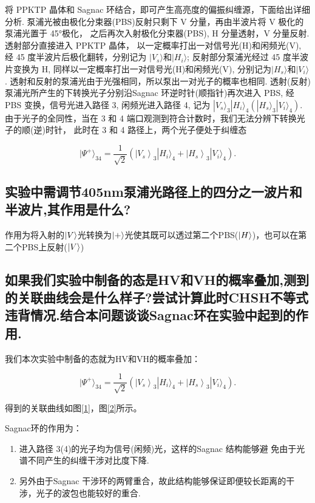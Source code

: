 \documentclass[a4paper,UTF8]{ctexart}
\begin{document}
 将 PPKTP 晶体和 Sagnac 环结合，即可产生高亮度的偏振纠缠源，下面给出详细分析. 
 泵浦光被由极化分束器(PBS)反射只剩下 V 分量，再由半波片将 V 极化的泵浦光置于 45°极化，
 之后再次入射极化分束器(PBS), H 分量透射，V 分量反射.透射部分直接进入 PPKTP 晶体，
 以一定概率打出一对信号光(H)和闲频光(V), 经 45 度半波片后极化翻转，分别记为
 $|V_s\rangle$和$|H_i\rangle$; 反射部分泵浦光经过 45 度半波片变换为 H, 
 同样以一定概率打出一对信号光(H)和闲频光(V), 分别记为$|H_s\rangle$和$|V_i\rangle$.
 透射和反射的泵浦光由于光强相同，所以泵出一对光子的概率也相同.
 透射(反射)泵浦光所产生的下转换光子分别沿Sagnac 环逆时针(顺指针)再次进入 PBS,
  经 PBS 变换，信号光进入路径 3, 闲频光进入路径 4, 记为
  $|V_s\rangle_3|H_i\rangle_4(|H_s\rangle_3|V_i\rangle_4)$.
  由于光子的全同性，当在 3 和 4 端口观测到符合计数时，我们无法分辨下转换光子的顺(逆)时针，
  此时在 3 和 4 路径上，两个光子便处于纠缠态

$$
|\Psi^{+}\rangle_{34}=\frac{1}{\sqrt{2}}\left(\left|V_{s}\right\rangle_{3}|H_{i}\rangle_{4}+\left|H_{s}\right\rangle_{3}|V_{i}\rangle_{4}\right).
$$ 

\subsection{实验中需调节405nm泵浦光路径上的四分之一波片和半波片,其作用是什么?}

作用为将入射的$\ket{V}$光转换为$\ket{+}$光使其既可以透过第二个PBS($\ket{H}$)，也可以在第二个PBS上反射($\ket{V}$)

\subsection{如果我们实验中制备的态是HV和VH的概率叠加,测到的关联曲线会是什么样子?尝试计算此时CHSH不等式违背情况.结合本问题谈谈Sagnac环在实验中起到的作用.}

我们本次实验中制备的态就为HV和VH的概率叠加：

$$
|\Psi^{+}\rangle_{34}=\frac{1}{\sqrt{2}}\left(\left|V_{s}\right\rangle_{3}|H_{i}\rangle_{4}+\left|H_{s}\right\rangle_{3}|V_{i}\rangle_{4}\right).
$$

得到的关联曲线如图\ref{1}，图\ref{2}所示。

Sagnac环的作用为：

\begin{enumerate}
    \item 进入路径 3(4)的光子均为信号(闲频)光，这样的Sagnac 结构能够避
免由于光谱不同产生的纠缠干涉对比度下降.
    \item  另外由于Sagnac 干涉环的两臂重合，故此结构能够保证即便较长距离的干涉，光子的波包也能较好的重合.
\end{enumerate}
\end{document}
